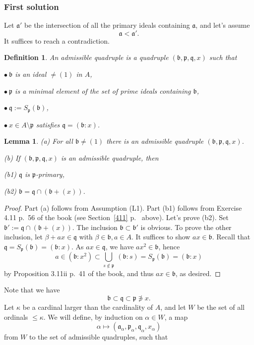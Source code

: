 \documentclass[parskip=half,fontsize=12pt]{scrartcl}%
\newcommand{\mf}{\mathfrak}
\newcommand{\aaa}{\mf a}
\newcommand{\bbb}{\mf b}
\newcommand{\ppp}{\mf p}
\newcommand{\qqq}{\mf q}
\newcommand{\bu}{\bullet}
\newtheorem{df}[thm]{Definition}
\newtheorem{lem}[thm]{Lemma}
\begin{document}
\subsubsection{First solution}%

Let $\aaa'$ be the intersection of all the primary ideals containing $\aaa$, and let's assume  
\begin{equation}\label{abs417}
\aaa<\aaa'.
\end{equation} 
It suffices to reach a contradiction.

\begin{df} 
An \emph{admissible quadruple} is a quadruple $(\bbb,\ppp,\qqq,x)$ such that 

$\bu\ \bbb$ is an ideal $\ne(1)$ in $A$, 

$\bu\ \mathfrak p$ is a minimal element of the set of prime ideals containing $\bbb$, 

$\bu\ \mathfrak q:=S_{\mathfrak p}(\bbb)$, 

$\bu\ x\in A\setminus\ppp$ satisfies $\mathfrak q=(\bbb:x)$. 
\end{df}

\begin{lem}\label{l417}
 \emph{(a)} For all $\bbb\ne(1)$ there is an admissible quadruple $(\bbb,\ppp,\qqq,x)$.

\emph{(b)} If $(\bbb,\ppp,\qqq,x)$ is an admissible quadruple, then 

\emph{(b1)} $\mathfrak q$ is $\mathfrak p$-primary, 

\emph{(b2)} $\bbb=\mathfrak q\cap(\bbb+(x))$.
\end{lem}

\begin{proof}
Part (a) follows from Assumption (L1). Part (b1) follows from Exercise 4.11 p.~56 of the book (see Section~\ref{411} p.~\pageref{411} above). Let's prove (b2). Set $\bbb':=\mathfrak q\cap(\bbb+(x))$. The inclusion $\bbb\subset\bbb'$ is obvious. To prove the other inclusion, let $\beta+ax\in\qqq$ with $\beta\in\bbb,a\in A$. It suffices to show $ax\in\bbb$. Recall that $\qqq=S_{\ppp}(\bbb)=(\bbb:x)$. As $ax\in\qqq$, we have $ax^2\in\bbb$, hence 
$$
a\in(\bbb:x^2)\subset\bigcup_{s\notin\ppp}\ (\bbb:s)=S_{\ppp}(\bbb)=(\bbb:x)
$$ 
by Proposition 3.11ii p.~41 of the book, and thus $ax\in\bbb$, as desired. 
\end{proof}

Note that we have 
$$
\bbb\subset\qqq\subset\ppp\not\ni x.
$$
Let $\kappa$ be a cardinal larger than the cardinality of $A$, and let $W$ be the set of all ordinals $\le\kappa$. We will define, by induction on $\alpha\in W$, a map 
\begin{equation}\label{e417a}
\alpha\mapsto(\aaa_\alpha,\ppp_\alpha,\qqq_\alpha,x_\alpha)
\end{equation}
from $W$ to the set of admissible quadruples, such that 
\end{document}
